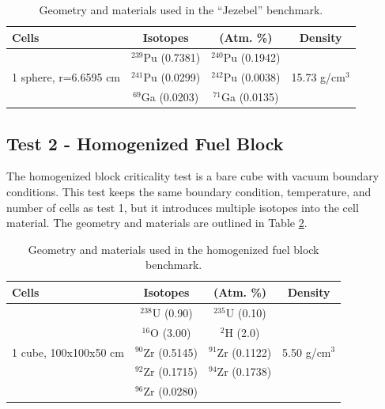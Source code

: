 \documentclass[preprint,12pt]{elsarticle}
\begin{document}
\begin{table}[h]
\centering
\caption{Geometry and materials used in the ``Jezebel'' benchmark.}
\label{jezebel_geom}
\begin{tabular}{| l | c  c | c |}
\hline
Cells & Isotopes & (Atm. \%)& Density \\
\hline
\multirow{3}{*}{1 sphere, r=6.6595 cm }  &  $^{239}$Pu (0.7381)    &    $^{240}$Pu (0.1942)     &  \multirow{3}{*}{15.73 g/cm$^3$} \\
                                         &  $^{241}$Pu (0.0299)    &     $^{242}$Pu (0.0038)    &   \\
                                         &  $^{69}$Ga  (0.0203)    &     $^{71}$Ga  (0.0135)    &   \\
\hline
\end{tabular}
\end{table}

\subsection{Test 2 - Homogenized Fuel Block}

The homogenized block criticality test is a bare cube with vacuum boundary conditions.  This test keeps the same boundary condition, temperature, and number of cells as test 1, but it introduces multiple isotopes into the cell material.   The geometry and materials are outlined in Table \ref{homfuel_geom}.  

\begin{table}[h]
\centering
\caption{Geometry and materials used in the homogenized fuel block benchmark.}
\label{homfuel_geom}
\begin{tabular}{| l | c  c | c |}
\hline
Cells & Isotopes & (Atm. \%)& Density \\
\hline
\multirow{5}{*}{1 cube, 100x100x50 cm }            &   $^{238}$U   (0.90)   &  $^{235}$U   (0.10)   &  \multirow{5}{*}{5.50 g/cm$^3$} \\
                                                   &   $^{16}$O    (3.00)   &  $^{2}$H     (2.0)    &  \\
                                                   &   $^{90}$Zr   (0.5145) &  $^{91}$Zr   (0.1122) &  \\
                                                   &   $^{92}$Zr   (0.1715) &  $^{94}$Zr   (0.1738) &  \\
                                                   &   $^{96}$Zr   (0.0280) &                       &  \\
\hline
\end{tabular}
\end{table}
\end{document}
